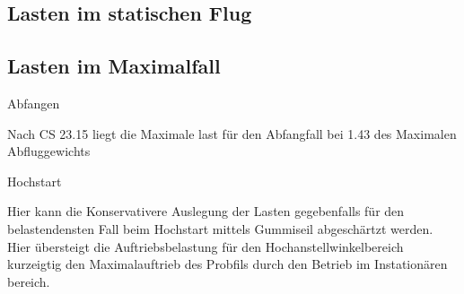 \subsection{Lasten im statischen Flug}

\subsection{Lasten im Maximalfall}

Abfangen

Nach CS 23.15 liegt die Maximale last für den Abfangfall bei 1.43 des Maximalen Abfluggewichts

Hochstart

Hier kann die Konservativere Auslegung der Lasten gegebenfalls für den belastendensten Fall beim Hochstart mittels Gummiseil abgeschärtzt werden. Hier übersteigt die Auftriebsbelastung für den Hochanstellwinkelbereich kurzeigtig den Maximalauftrieb des Probfils durch den Betrieb im Instationären bereich.